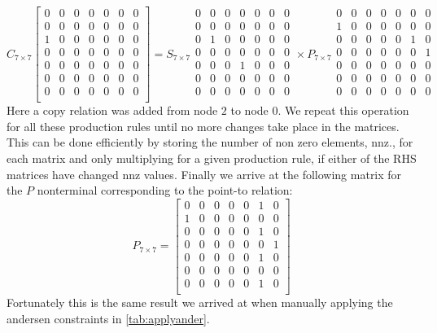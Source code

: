 \[
    C_{7\times 7}
    \begin{bmatrix}
        0 & 0 & 0 & 0 & 0 & 0 & 0 \\
        0 & 0 & 0 & 0 & 0 & 0 & 0 \\
        1 & 0 & 0 & 0 & 0 & 0 & 0 \\
        0 & 0 & 0 & 0 & 0 & 0 & 0 \\
        0 & 0 & 0 & 0 & 0 & 0 & 0 \\
        0 & 0 & 0 & 0 & 0 & 0 & 0 \\
        0 & 0 & 0 & 0 & 0 & 0 & 0 \\
    \end{bmatrix}
    =
    S_{7\times 7}
    \begin{smallmatrix}
        0 & 0 & 0 & 0 & 0 & 0 & 0 \\
        0 & 0 & 0 & 0 & 0 & 0 & 0 \\
        0 & 1 & 0 & 0 & 0 & 0 & 0 \\
        0 & 0 & 0 & 0 & 0 & 0 & 0 \\
        0 & 0 & 0 & 1 & 0 & 0 & 0 \\
        0 & 0 & 0 & 0 & 0 & 0 & 0 \\
        0 & 0 & 0 & 0 & 0 & 0 & 0 \\
    \end{smallmatrix}
    \times
    P_{7\times 7}
    \begin{smallmatrix}
        0 & 0 & 0 & 0 & 0 & 0 & 0 \\
        1 & 0 & 0 & 0 & 0 & 0 & 0 \\
        0 & 0 & 0 & 0 & 0 & 1 & 0 \\
        0 & 0 & 0 & 0 & 0 & 0 & 1 \\
        0 & 0 & 0 & 0 & 0 & 0 & 0 \\
        0 & 0 & 0 & 0 & 0 & 0 & 0 \\
        0 & 0 & 0 & 0 & 0 & 0 & 0 \\
    \end{smallmatrix}
\]
Here a copy relation was added from node $2$ to node $0$.
We repeat this operation for all these production rules until no more changes take place in the matrices.
This can be done efficiently by storing the number of non zero elements, nnz., for each matrix and only multiplying for a given production rule, if either of the RHS matrices have changed nnz values.
Finally we arrive at the following matrix for the $P$ nonterminal corresponding to the point-to relation:
\[
    P_{7\times 7} =
    \begin{bmatrix}
        0 & 0 & 0 & 0 & 0 & 1 & 0 \\
        1 & 0 & 0 & 0 & 0 & 0 & 0 \\
        0 & 0 & 0 & 0 & 0 & 1 & 0 \\
        0 & 0 & 0 & 0 & 0 & 0 & 1 \\
        0 & 0 & 0 & 0 & 0 & 1 & 0 \\
        0 & 0 & 0 & 0 & 0 & 0 & 0 \\
        0 & 0 & 0 & 0 & 0 & 1 & 0 \\
    \end{bmatrix}
\]
Fortunately this is the same result we arrived at when manually applying the andersen constraints in \autoref{tab:applyander}.

